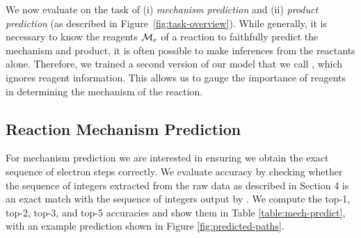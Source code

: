 We now evaluate \ourModelR on the task of (i) \emph{mechanism prediction} and (ii) \emph{product prediction} (as described in Figure~\ref{fig:task-overview}). While generally, it is necessary to know the reagents ${\mathcal{M}}_e$ of a reaction to faithfully predict the mechanism and product, it is often possible to make inferences from the reactants alone. Therefore, we trained a second version of our model that we call \ourModelIR, which ignores reagent information. This allows us 
to gauge the importance of reagents in determining the mechanism of the reaction. %





\subsection{Reaction Mechanism Prediction}

For mechanism prediction we are interested in ensuring we obtain the exact sequence of electron steps correctly. 
We evaluate accuracy by checking whether the sequence of integers extracted from the raw data as described in Section 4
is an exact match with the sequence of integers output by \ourModel. We compute the top-1, top-2, top-3, and top-5 accuracies and show them in Table \ref{table:mech-predict}, with an example prediction shown in Figure \ref{fig:predicted-paths}.



